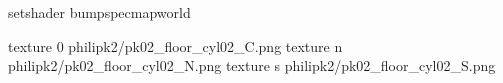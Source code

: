 setshader bumpspecmapworld

texture 0 philipk2/pk02_floor_cyl02_C.png
texture n philipk2/pk02_floor_cyl02_N.png
texture s philipk2/pk02_floor_cyl02_S.png
